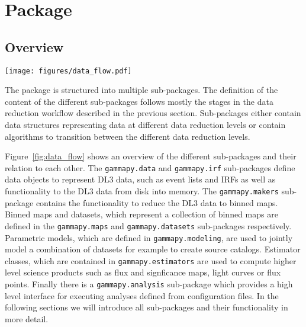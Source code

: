 \documentclass[traditabstract, longauth]{aa}
\newcommand{\code}[1]{\texttt{#1}}
\begin{document}
\section{\gammapy Package}
\label{sec:gammapy-package}
\subsection{Overview}
\label{ssec:overview}
%
\begin{figure*}[ht!]
	\centering
	\texttt{[image: figures/data\_flow.pdf]}
	\caption{
		\gammapy sub-package structure and data analysis workflow. The top row
        defines the groups for the different data levels and reduction steps
        from raw gamma-like events on the left, to high level science products
        on the right. The direction of the data flow is illustrated with the
        grey arrows. The gray folder icons represent the different sub-packages
        in \gammapy and their names. Below each icon there is a list of the most
        important objects defined in the sub-package.
    }
	\label{fig:data_flow}
\end{figure*}
%
The \gammapy package is structured into multiple sub-packages. The definition
of the content of the different sub-packages follows mostly the stages in the
data reduction workflow described in the previous section. Sub-packages
either contain data structures representing data at different data reduction
levels or contain algorithms to transition between the different data reduction
levels.

Figure~\ref{fig:data_flow} shows an overview of the different sub-packages and
their relation to each other. The \code{gammapy.data} and \code{gammapy.irf}
sub-packages define data objects to represent DL3 data, such as
event lists and IRFs as well as functionality
to the DL3 data from disk into memory. The \code{gammapy.makers} sub-package
contains the functionality to reduce the DL3 data to binned maps.
Binned maps and datasets, which represent a collection of binned
maps are defined in the \code{gammapy.maps} and \code{gammapy.datasets}
sub-packages respectively. Parametric models, which are defined in
\code{gammapy.modeling}, are used to jointly model a combination
of datasets for example to create source catalogs. Estimator classes,
which are contained in \code{gammapy.estimators} are used to
compute higher level science products such as flux and signficance maps,
light curves or flux points. Finally there is a \code{gammapy.analysis}
sub-package which provides a high level interface for executing analyses
defined from configuration files. In the following sections we will
introduce all sub-packages and their functionality in more detail.
\end{document}

